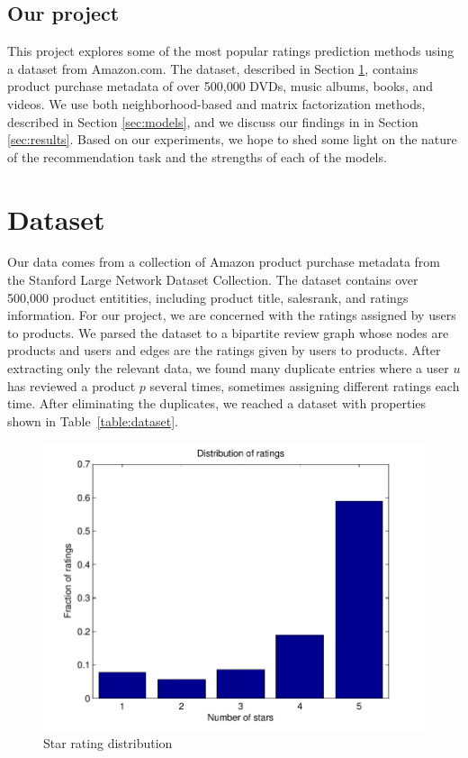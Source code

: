 \documentclass[letterpaper, 10 pt, conference]{ieeeconf}
\begin{document}
\subsection{Our project}
This project explores some of the most popular ratings prediction methods using 
a dataset from Amazon.com. The dataset, described in Section 
\ref{sec:dataset}, contains product purchase metadata of over 500,000 DVDs, 
music albums, books, and videos. We use both neighborhood-based and 
matrix factorization methods, described in Section \ref{sec:models}, and we 
discuss our findings in in Section \ref{sec:results}. Based on our 
experiments, we hope to shed some light on the nature of the recommendation 
task and the strengths of each of the models.


\section{Dataset}
\label{sec:dataset}
Our data comes from a collection of Amazon product purchase metadata from 
the Stanford Large Network Dataset Collection. The dataset contains over 
500,000 product entitities, including product title, salesrank, and ratings 
information. For our project, we are concerned with the ratings assigned 
by users to products. We parsed the dataset to a bipartite review 
graph whose nodes are products and users and edges are the ratings given by 
users to products. After extracting only the relevant data, we found many 
duplicate entries where a user $u$ has reviewed a product $p$ several times, 
sometimes assigning different ratings each time. After eliminating the 
duplicates, we reached a dataset with properties shown in 
Table~\ref{table:dataset}.



\begin{figure}[h]
\includegraphics[scale=0.6]{images/ratings.pdf}
\caption{Star rating distribution}
\label{fig:ratings}
\end{figure}
\end{document}
